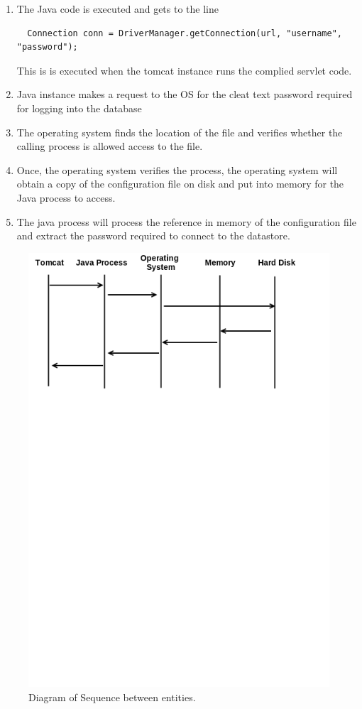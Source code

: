 \documentclass[11pt, a4paper, twoside, openany, notitlepage]{report}
\begin{document}
\begin{enumerate}
\item The Java code is executed and gets to the line
\begin{lstlisting}
  Connection conn = DriverManager.getConnection(url, "username", "password");
\end{lstlisting}
This is is executed when the tomcat instance runs the complied servlet code.
\item Java instance makes a request to the OS for the cleat text password required for logging into the database
\item The operating system finds the location of the file and verifies whether the calling process is allowed access to the file.
\item Once, the operating system verifies the process, the operating system will obtain a copy of the configuration file on disk and put into memory for the Java process to access.
\item The java process will process the reference in memory of the configuration file and extract the password required to connect to the datastore.
\end{enumerate}

\begin{figure}[h!]
    \centering
    \includegraphics[height=0.2\paperheight]{sequence_diagram}
    \caption{Diagram of Sequence between entities.}
\end{figure}
\end{document}
